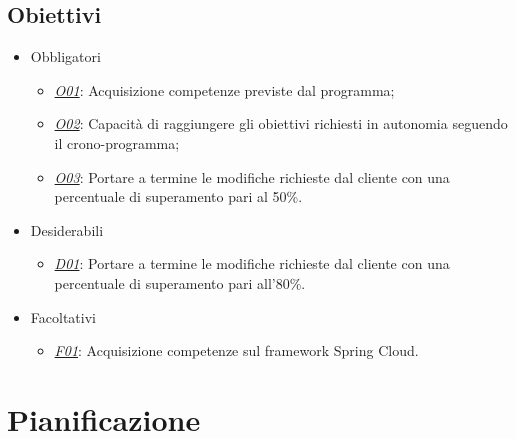 
\subsection{Obiettivi}

\begin{itemize}[noitemsep]
	\item Obbligatori
	\begin{itemize}
		\item \underline{\textit{O01}}: Acquisizione competenze previste dal programma;
		\item \underline{\textit{O02}}: Capacità di raggiungere gli obiettivi richiesti in autonomia seguendo il crono-programma;
		\item \underline{\textit{O03}}: Portare a termine le modifiche richieste dal cliente con una percentuale di superamento pari al 50\%.
	\end{itemize}
	\item Desiderabili
	\begin{itemize}
		\item \underline{\textit{D01}}: Portare a termine le modifiche richieste dal cliente con una percentuale di superamento pari all'80\%.
	\end{itemize}
	\item Facoltativi
	\begin{itemize}
		\item \underline{\textit{F01}}: Acquisizione competenze sul framework Spring Cloud.
	\end{itemize}
\end{itemize}


%


\section{Pianificazione}

